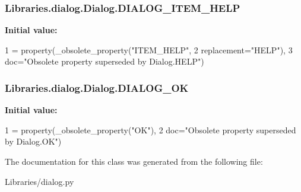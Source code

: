 \subsubsection[{\texorpdfstring{D\+I\+A\+L\+O\+G\+\_\+\+I\+T\+E\+M\+\_\+\+H\+E\+LP}{DIALOG_ITEM_HELP}}]{\setlength{\rightskip}{0pt plus 5cm}Libraries.\+dialog.\+Dialog.\+D\+I\+A\+L\+O\+G\+\_\+\+I\+T\+E\+M\+\_\+\+H\+E\+LP\hspace{0.3cm}{\ttfamily [static]}}\hypertarget{class_libraries_1_1dialog_1_1_dialog_a3fc7ff9fc8de470cc0bc37124e883fbe}{}\label{class_libraries_1_1dialog_1_1_dialog_a3fc7ff9fc8de470cc0bc37124e883fbe}
{\bfseries Initial value\+:}
\begin{DoxyCode}
1 = property(\_obsolete\_property(\textcolor{stringliteral}{"ITEM\_HELP"},
2                                                    replacement=\textcolor{stringliteral}{"HELP"}),
3                          doc=\textcolor{stringliteral}{"Obsolete property superseded by Dialog.HELP"})
\end{DoxyCode}
\subsubsection[{\texorpdfstring{D\+I\+A\+L\+O\+G\+\_\+\+OK}{DIALOG_OK}}]{\setlength{\rightskip}{0pt plus 5cm}Libraries.\+dialog.\+Dialog.\+D\+I\+A\+L\+O\+G\+\_\+\+OK\hspace{0.3cm}{\ttfamily [static]}}\hypertarget{class_libraries_1_1dialog_1_1_dialog_a93b4d6641a648f5a3088f9096996ff1d}{}\label{class_libraries_1_1dialog_1_1_dialog_a93b4d6641a648f5a3088f9096996ff1d}
{\bfseries Initial value\+:}
\begin{DoxyCode}
1 = property(\_obsolete\_property(\textcolor{stringliteral}{"OK"}),
2                          doc=\textcolor{stringliteral}{"Obsolete property superseded by Dialog.OK"})
\end{DoxyCode}


The documentation for this class was generated from the following file\+:\begin{DoxyCompactItemize}
\item 
Libraries/dialog.\+py\end{DoxyCompactItemize}
